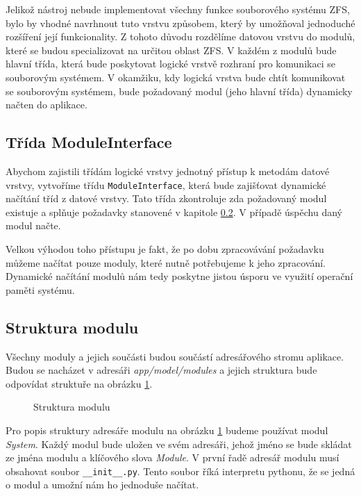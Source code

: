 Jelikož nástroj nebude implementovat všechny funkce souborového systému ZFS, bylo by vhodné navrhnout tuto vrstvu způsobem, který by umožňoval jednoduché rozšíření její funkcionality.
Z tohoto důvodu rozdělíme datovou vrstvu do modulů, které se budou specializovat na určitou oblast ZFS. V každém z modulů bude hlavní třída, která bude poskytovat logické vrstvě rozhraní pro komunikaci se souborovým systémem. V okamžiku, kdy logická vrstva bude chtít komunikovat se souborovým systémem, bude požadovaný modul (jeho hlavní třída) dynamicky načten do aplikace.
    \subsection{Třída ModuleInterface}
    Abychom zajistili třídám logické vrstvy jednotný přístup k metodám datové vrstvy, vytvoříme třídu \verb|ModuleInterface|, která bude zajišťovat dynamické načítání tříd z datové vrstvy. Tato třída zkontroluje zda požadovaný modul existuje a splňuje požadavky stanovené v kapitole \ref{package}. V případě úspěchu daný modul načte.

    Velkou výhodou toho přístupu je fakt, že po dobu zpracovávání požadavku můžeme načítat pouze moduly, které nutně potřebujeme k jeho zpracování. Dynamické načítání modulů nám tedy poskytne jistou úsporu ve využití operační paměti systému.
    \subsection{Struktura modulu}
    \label{package}
    Všechny moduly a jejich součásti budou součástí adresářového stromu aplikace. Budou se nacházet v adresáři \emph{app/model/modules} a jejich struktura bude odpovídat struktuře na obrázku \ref{module}.
    \begin{figure}
      \centering     
      \caption{Struktura modulu}
      \label{module}
    \end{figure}

    Pro popis struktury adresáře modulu na obrázku \ref{module} budeme používat modul \emph{System}. Každý modul bude uložen ve svém adresáři, jehož jméno se bude skládat ze jména modulu a klíčového slova \emph{Module}. V první řadě adresář modulu musí obsahovat soubor \verb|__init__.py|. Tento soubor říká interpretu pythonu, že se jedná o modul a umožní nám ho jednoduše načítat.

